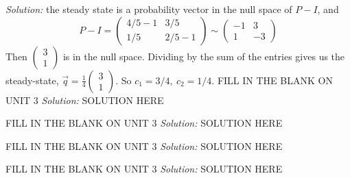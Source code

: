     \ifnum {} {\color{DarkBlue} \textit{Solution:} the steady state is a probability vector in the null space of $P-I$, and $$P-I = \begin{pmatrix} 4/5-1&3/5\\1/5&2/5-1 \end{pmatrix} \sim \begin{pmatrix} -1&3\\1&-3\end{pmatrix}$$ Then $\begin{pmatrix} 3\\1\end{pmatrix}$ is in the null space. Dividing by the sum of the entries gives us the steady-state, $\vec q = \frac14 \begin{pmatrix} 3\\1\end{pmatrix}$. So $c_1 = 3/4, \ c_2 = 1/4$. } \fi   
\fi 
\ifnum {} %
    FILL IN THE BLANK ON UNIT 3
    \ifnum {} {\color{DarkBlue} \textit{Solution:} SOLUTION HERE  } \fi    
\fi 

\ifnum {} %
    FILL IN THE BLANK ON UNIT 3
    \ifnum {} {\color{DarkBlue} \textit{Solution:} SOLUTION HERE  } \fi    
\fi 

\ifnum {} %
    FILL IN THE BLANK ON UNIT 3
    \ifnum {} {\color{DarkBlue} \textit{Solution:} SOLUTION HERE  } \fi    
\fi 

\ifnum {} %
    FILL IN THE BLANK ON UNIT 3
    \ifnum {} {\color{DarkBlue} \textit{Solution:} SOLUTION HERE  } \fi    
\fi 





